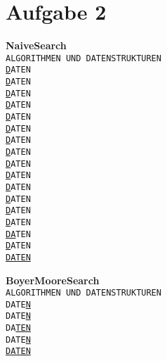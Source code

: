 \section*{Aufgabe 2}

\begin{minipage}[t]{0.5\textwidth}
    \textbf{NaiveSearch} ~\\[0.5cm]
    
	\texttt{ALGORITHMEN UND DATENSTRUKTUREN \\
    \leavevmode\hphantom{}\underline{D}ATEN \\
    \leavevmode\hphantom{A}\underline{D}ATEN \\
    \leavevmode\hphantom{AL}\underline{D}ATEN \\
    \leavevmode\hphantom{ALG}\underline{D}ATEN \\
    \leavevmode\hphantom{ALGO}\underline{D}ATEN \\
    \leavevmode\hphantom{ALGOR}\underline{D}ATEN \\
    \leavevmode\hphantom{ALGORI}\underline{D}ATEN \\
    \leavevmode\hphantom{ALGORIT}\underline{D}ATEN \\
    \leavevmode\hphantom{ALGORITH}\underline{D}ATEN \\
    \leavevmode\hphantom{ALGORITHM}\underline{D}ATEN \\
    \leavevmode\hphantom{ALGORITHME}\underline{D}ATEN \\
    \leavevmode\hphantom{ALGORITHMEN}\underline{D}ATEN \\
    \leavevmode\hphantom{ALGORITHMEN }\underline{D}ATEN \\
    \leavevmode\hphantom{ALGORITHMEN U}\underline{D}ATEN \\
    \leavevmode\hphantom{ALGORITHMEN UN}\underline{DA}TEN \\
    \leavevmode\hphantom{ALGORITHMEN UND}\underline{D}ATEN \\
    \leavevmode\hphantom{ALGORITHMEN UND }\underline{DATEN}}
\end{minipage}
%
\begin{minipage}[t]{0.5\textwidth}
	\textbf{BoyerMooreSearch}\footnotemark[1] ~\\[0.5cm]
	
    \texttt{ALGORITHMEN UND DATENSTRUKTUREN \\
    \leavevmode\hphantom{}DATE\underline{N} \\
    \leavevmode\hphantom{ALGOR}DATE\underline{N} \\
    \leavevmode\hphantom{ALGORI}DA\underline{TEN} \\
    \leavevmode\hphantom{ALGORITHMEN}DATE\underline{N} \\
    \leavevmode\hphantom{ALGORTHMEN UND }\underline{DATEN}}
\end{minipage}
